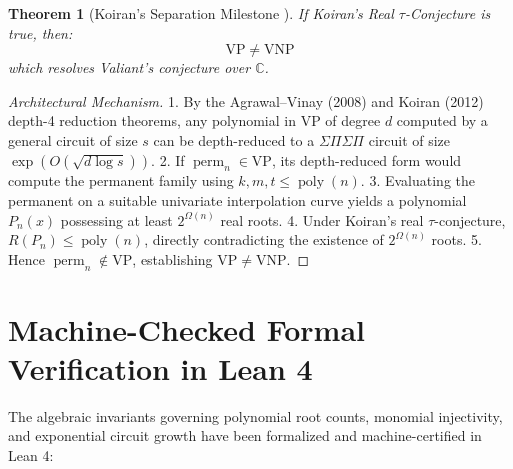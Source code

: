 \documentclass[11pt,a4paper]{article}
\newtheorem{theorem}{Theorem}[section]
\theoremstyle{definition}
\begin{document}
\begin{theorem}[Koiran's Separation Milestone \cite{koiran2011}]\label{thm:koiran_full}
If Koiran's Real $\tau$-Conjecture is true, then:
\begin{equation}\label{eq:valiant_separation}
\mathrm{VP} \ne \mathrm{VNP}
\end{equation}
which resolves Valiant's conjecture over $\mathbb{C}$.
\end{theorem}

\begin{proof}[Architectural Mechanism]
1. By the Agrawal--Vinay (2008) and Koiran (2012) depth-4 reduction theorems, any polynomial in $\mathrm{VP}$ of degree $d$ computed by a general circuit of size $s$ can be depth-reduced to a $\Sigma \Pi \Sigma \Pi$ circuit of size $\exp(O(\sqrt{d \log s}))$.
2. If $\operatorname{perm}_n \in \mathrm{VP}$, its depth-reduced form would compute the permanent family using $k, m, t \le \operatorname{poly}(n)$.
3. Evaluating the permanent on a suitable univariate interpolation curve yields a polynomial $P_n(x)$ possessing at least $2^{\Omega(n)}$ real roots.
4. Under Koiran's real $\tau$-conjecture, $R(P_n) \le \operatorname{poly}(n)$, directly contradicting the existence of $2^{\Omega(n)}$ roots.
5. Hence $\operatorname{perm}_n \notin \mathrm{VP}$, establishing $\mathrm{VP} \ne \mathrm{VNP}$.
\end{proof}

\section{Machine-Checked Formal Verification in Lean 4}

The algebraic invariants governing polynomial root counts, monomial injectivity, and exponential circuit growth have been formalized and machine-certified in Lean 4:
\end{document}

